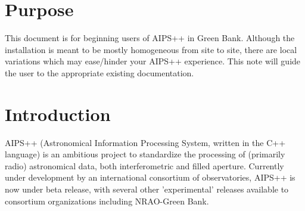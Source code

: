 %
%
%
\newcommand{\thisdocURL}{http://aips2.nrao.edu/aips++/docs/notes/206/206.html}
\newcommand{\searchURL}{../../html/aips2search.html}
\newcommand{\aipsviewURL}{../../user/aipsview/aipsview.html}
\newcommand{\GlishmanualURL}{../../reference/Glish/Glish.html}
\newcommand{\GlishtutorialURL}{../../notes/195/195.html}
\newcommand{\synthesisURL}{../../user/synthesis/synthesis.html}
\newcommand{\gsURL}{../../user/gettingstarted/gettingstarted.html}
\newcommand{\userrefmanualURL}{../../user/Refman/Refman.html}
\newcommand{\specsURL}{../../specs/specs.html}
\newcommand{\betaURL}{../beta/beta.html}
\newcommand{\consortiumURL}{../consortium.html}
\def\drakoshomelink{http://cbl.leeds.ac.uk/nilos/personal.html}
\def\thisdocURL{http://aips2.nrao.edu/aips++/docs/notes/206/206.html}
\def\gbthomelink{http://www.gb.nrao.edu/GBT/GBT.html}
\def\vlahomelink{http://www.nrao.edu/doc/vla/html/VLAhome.shtml}
\def\cvhomelink{http://www.cv.nrao.edu/cv-home.html}

%
%

%


\section{Purpose}

This document is for beginning users of AIPS++ in Green Bank. Although the
installation is meant to be mostly homogeneous from site to site, there
are local variations which may ease/hinder your AIPS++ experience. 
This note will guide the user to the appropriate existing documentation.

\bigskip
\section{Introduction}

AIPS++ (Astronomical Information Processing System, written in the C++ 
language) is an ambitious project to standardize the
processing of (primarily radio) astronomical data, both interferometric
and filled aperture. Currently under development by an international
consortium of observatories, AIPS++ is now under beta release, with
several other 'experimental' releases available to consortium organizations
including NRAO-Green Bank.

